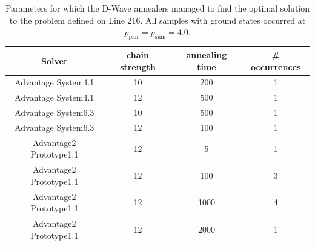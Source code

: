 \begin{table}
  \small
  \centering
  \begin{tabular}{|c|c|c|c|}
    \hline
    \rowcolor{theader} Solver & chain strength & annealing time & \# occurrences \\
    \hline
    Advantage System4.1       & 10             & 200            & 1              \\
    \hline
    Advantage System4.1       & 12             & 500            & 1              \\
    \hline
    \hline
    Advantage System6.3       & 10             & 500            & 1              \\
    \hline
    Advantage System6.3       & 12             & 100            & 1              \\
    \hline
    \hline
    Advantage2 Prototype1.1   & 12             & 5              & 1              \\
    \hline
    Advantage2 Prototype1.1   & 12             & 100            & 3              \\
    \hline
    Advantage2 Prototype1.1   & 12             & 1000           & 4              \\
    \hline
    Advantage2 Prototype1.1   & 12             & 2000           & 1              \\
    \hline
  \end{tabular}
  \caption{Parameters for which the D-Wave annealers managed to find the optimal solution to
    the problem defined on Line 216. All samples with ground states occurred at
    $p_{\text{pair}}=p_{\text{sum}}=4.0$. } \label{tab:line216ground}
\end{table}

